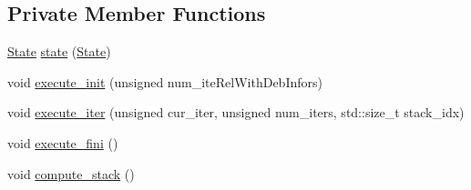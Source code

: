 \subsection*{\-Private \-Member \-Functions}
\begin{DoxyCompactItemize}
\item 
\hyperlink{classecto_1_1scheduler_a6b063d1c4bb9dad58d7ace61946b1200}{\-State} \hyperlink{classecto_1_1scheduler_a04cb7ea1040fcb02f5c843ca33ffa1a6}{state} (\hyperlink{classecto_1_1scheduler_a6b063d1c4bb9dad58d7ace61946b1200}{\-State})
\item 
void \hyperlink{classecto_1_1scheduler_adc21b65d6b046032648161c16ca89f77}{execute\-\_\-init} (unsigned num\-\_\-ite\-Rel\-With\-Deb\-Infors)
\item 
void \hyperlink{classecto_1_1scheduler_ae96db9aa735b4aec8eda6c1ea5616b95}{execute\-\_\-iter} (unsigned cur\-\_\-iter, unsigned num\-\_\-iters, std\-::size\-\_\-t stack\-\_\-idx)
\item 
void \hyperlink{classecto_1_1scheduler_abab4de26974143a076ac532ffac4f67f}{execute\-\_\-fini} ()
\item 
void \hyperlink{classecto_1_1scheduler_ad922a0a31e48a09ae6b6a95a4a1a20e5}{compute\-\_\-stack} ()
\end{DoxyCompactItemize}
